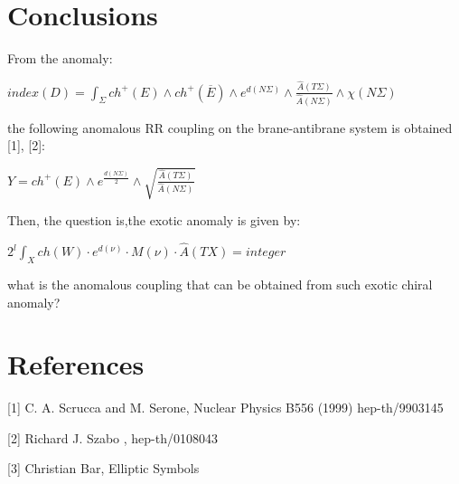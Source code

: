 \documentclass[a4paper,a4paper]{article}
\begin{document}
\section{Conclusions}

From the anomaly:
\begin{center}
\setlength{\baselineskip}{40pt}
 {  $  index(D)
=\int_{\Sigma}ch^{+}(E)\wedge{ch^{+}(\overline{E})}\wedge{e^{d(N\Sigma)}}\wedge\frac{\hat{A}(T\Sigma)}{\hat{A}(N\Sigma)}\wedge{\chi(N\Sigma)}$
}
\end{center}
the following anomalous RR coupling on the brane-antibrane system is obtained [1],
[2]:
\begin{center}
\setlength{\baselineskip}{40pt}
 {  $  Y
=ch^{+}(E)\wedge{e^{\frac{d(N\Sigma)}{2}}}\wedge\sqrt{\frac{\hat{A}(T\Sigma)}{\hat{A}(N\Sigma)}}$
}
\end{center}

Then, the question is,the exotic anomaly is given by:
\begin{center}
\setlength{\baselineskip}{40pt}
 {  $
2^{l}\int_{X}ch(W)\cdot{e^{d(\nu)}}\cdot{M(\nu)}\cdot{\hat{A}(TX)}=integer$ }
\end{center}
what is the anomalous coupling that can be obtained from such exotic chiral anomaly?
\section{References}

[1]  C. A. Scrucca  and M. Serone, Nuclear Physics B556 (1999)  hep-th/9903145

[2]  Richard J. Szabo ,  hep-th/0108043

[3]  Christian Bar,  Elliptic Symbols
\end{document}

